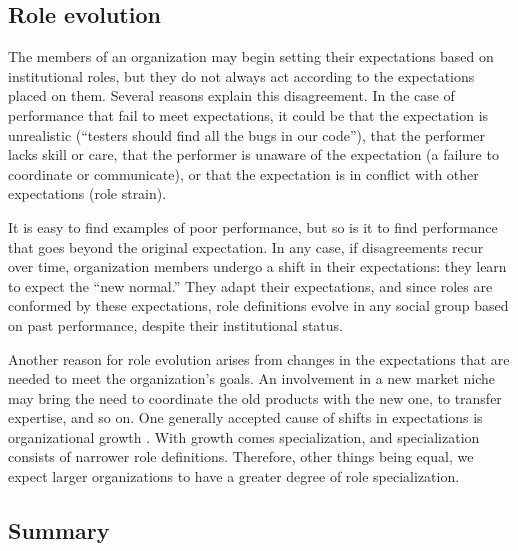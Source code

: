 \documentclass[10pt, conference, compsocconf]{IEEEtran}
\begin{document}
\subsection{Role evolution}

The members of an organization may begin setting their expectations based on institutional roles, but they do not always act according to the expectations placed on them. Several reasons explain this disagreement. In the case of performance that fail to meet expectations, it could be that the expectation is unrealistic (``testers should find all the bugs in our code''), that the performer lacks skill or care, that the performer is unaware of the expectation (a failure to coordinate or communicate), or that the expectation is in conflict with other expectations (role strain).

It is easy to find examples of poor performance, but so is it to find performance that goes beyond the original expectation. In any case, if disagreements recur over time, organization members undergo a shift in their expectations: they learn to expect the ``new normal.'' They adapt their expectations, and since roles are conformed by these expectations, role definitions evolve in any social group based on past performance, despite their institutional status.

Another reason for role evolution arises from changes in the expectations that are needed to meet the organization's goals. An involvement in a new market niche may bring the need to coordinate the old products with the new one, to transfer expertise, and so on. One generally accepted cause of shifts in expectations is organizational growth \cite{Blau1971,Haveman1993}. With growth comes specialization, and specialization consists of narrower role definitions. Therefore, other things being equal, we expect larger organizations to have a greater degree of role specialization.


\subsection{Summary}
\end{document}
